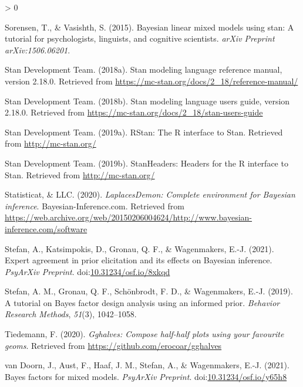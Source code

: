 \documentclass[
  english,
  doc,floatsintext]{apa6}
\newlength{\cslhangindent}
\newenvironment{CSLReferences}[2] %
 {%
  \setlength{\parindent}{0pt}
  \ifodd #1 \everypar{\setlength{\hangindent}{\cslhangindent}}\ignorespaces\fi
  \ifnum #2 > 0
  \setlength{\parskip}{#2\baselineskip}
  \fi
 }%
 {}
\begin{document}
\begin{CSLReferences}{1}{0}
\leavevmode\hypertarget{ref-sorensen2015bayesian}{}%
Sorensen, T., \& Vasishth, S. (2015). Bayesian linear mixed models using stan: A tutorial for psychologists, linguists, and cognitive scientists. \emph{arXiv Preprint arXiv:1506.06201}.

\leavevmode\hypertarget{ref-stan2018b}{}%
Stan Development Team. (2018a). Stan modeling language reference manual, version 2.18.0. Retrieved from \url{https://mc-stan.org/docs/2_18/reference-manual/}

\leavevmode\hypertarget{ref-stan2018a}{}%
Stan Development Team. (2018b). Stan modeling language users guide, version 2.18.0. Retrieved from \url{https://mc-stan.org/docs/2_18/stan-users-guide}

\leavevmode\hypertarget{ref-R-rstan}{}%
Stan Development Team. (2019a). {RStan}: The {R} interface to {Stan}. Retrieved from \url{http://mc-stan.org/}

\leavevmode\hypertarget{ref-R-StanHeaders}{}%
Stan Development Team. (2019b). {StanHeaders}: Headers for the {R} interface to {Stan}. Retrieved from \url{http://mc-stan.org/}

\leavevmode\hypertarget{ref-R-LaplacesDemon}{}%
Statisticat, \& LLC. (2020). \emph{LaplacesDemon: Complete environment for {Bayesian} inference}. Bayesian-Inference.com. Retrieved from \url{https://web.archive.org/web/20150206004624/http://www.bayesian-inference.com/software}

\leavevmode\hypertarget{ref-Stefan_etal2021}{}%
Stefan, A., Katsimpokis, D., Gronau, Q. F., \& Wagenmakers, E.-J. (2021). Expert agreement in prior elicitation and its effects on {Bayesian} inference. \emph{PsyArXiv Preprint}. doi:\href{https://doi.org/10.31234/osf.io/8xkqd}{10.31234/osf.io/8xkqd}

\leavevmode\hypertarget{ref-stefan2019tutorial}{}%
Stefan, A. M., Gronau, Q. F., Schönbrodt, F. D., \& Wagenmakers, E.-J. (2019). A tutorial on {Bayes} factor design analysis using an informed prior. \emph{Behavior Research Methods}, \emph{51}(3), 1042--1058.

\leavevmode\hypertarget{ref-R-gghalves}{}%
Tiedemann, F. (2020). \emph{Gghalves: Compose half-half plots using your favourite geoms}. Retrieved from \url{https://github.com/erocoar/gghalves}

\leavevmode\hypertarget{ref-van2021bayes}{}%
van Doorn, J., Aust, F., Haaf, J. M., Stefan, A., \& Wagenmakers, E.-J. (2021). Bayes factors for mixed models. \emph{PsyArXiv Preprint}. doi:\href{https://doi.org/10.31234/osf.io/y65h8}{10.31234/osf.io/y65h8}


\end{CSLReferences}
\end{document}
